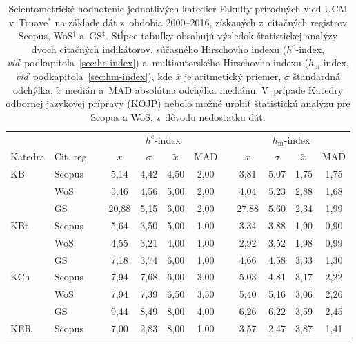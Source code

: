 \begin{table}
  \centering\small
  \caption[Hodnotenie FPV -- $h^{\mathrm{c}}$-index a~$h_{\mathrm{m}}$-index]%
  {Scientometrické hodnotenie jednotlivých katedier Fakulty prírodných vied UCM
    v~Trnave$^\ast$ na základe dát z~obdobia 2000--2016, získaných z~citačných
    registrov Scopus, WoS$^\dagger$ a~GS$^\ddagger$.  Stĺpce tabuľky obsahujú
    výsledok štatistickej analýzy dvoch citačných indikátorov, súčasného
    Hirschovho indexu ($h^{\mathrm{c}}$-index,
    \emph{viď}~podkapitola~\ref{sec:hc-index}) a~multiautorského Hirschovho
    indexu ($h_{\mathrm{m}}$-index, \emph{viď}~podkapitola~\ref{sec:hm-index}),
    kde $\bar{x}$ je aritmetický priemer, $\sigma$ štandardná odchýlka,
    $\tilde{x}$ medián a~MAD absolútna odchýlka mediánu.  V~prípade Katedry
    odbornej jazykovej prípravy (KOJP) nebolo možné urobiť štatistickú analýzu
    pre Scopus a WoS, z~dôvodu nedostatku dát.}
  \label{tab:6-staff.results}
  \begin{tabularx}{\textwidth}{XXp{1ex}ccccp{1ex}cccc}
    \toprule
    & & & \multicolumn{4}{c}{$h^{\mathrm{c}}$-index} & & \multicolumn{4}{c}{$h_{\mathrm{m}}$-index} \\
    \cmidrule{4-7}\cmidrule{9-12}
    Katedra & Cit. reg. & & $\bar{x}$ & $\sigma$ & $\tilde{x}$ & MAD & & $\bar{x}$ & $\sigma$ & $\tilde{x}$ & MAD \\
    \midrule
    KB   & Scopus & & 5,14  & 4,42 & 4,50  & 2,00 & & 3,81  & 5,07 & 1,75 & 1,75 \\
         & WoS    & & 5,46  & 4,56 & 5,00  & 2,00 & & 4,04  & 5,23 & 2,88 & 1,68 \\
         & GS     & & 20,88 & 5,15 & 6,00  & 2,00 & & 27,88 & 5,60 & 2,34 & 1,99 \\[1ex]
    KBt  & Scopus & & 5,64  & 3,50 & 5,00  & 1,00 & & 3,34  & 3,88 & 1,90 & 0,90 \\
         & WoS    & & 4,55  & 3,21 & 4,00  & 1,00 & & 2,92  & 3,52 & 1,98 & 0,99 \\
         & GS     & & 7,18  & 3,74 & 6,00  & 1,00 & & 4,66  & 4,58 & 3,33 & 1,30 \\[1ex]
    KCh  & Scopus & & 7,94  & 7,68 & 6,00  & 3,00 & & 5,03  & 4,81 & 3,17 & 2,22 \\
         & WoS    & & 7,94  & 7,39 & 6,50  & 3,50 & & 5,40  & 5,16 & 3,06 & 2,26 \\
         & GS     & & 9,44  & 8,49 & 8,00  & 4,00 & & 6,26  & 6,22 & 3,59 & 2,45 \\[1ex]
    KER  & Scopus & & 7,00  & 2,83 & 8,00  & 1,00 & & 3,57  & 2,47 & 3,87 & 1,41 \\

\end{tabularx}
\end{table}
